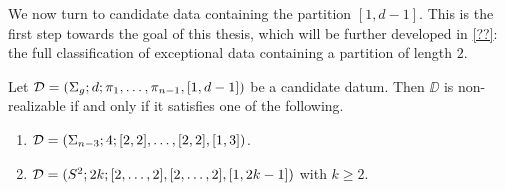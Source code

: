 We now turn to candidate data containing the partition $[1,d-1]$. This is the first step towards the goal of this thesis, which will be further developed in \cref{??}: the full classification of exceptional data containing a partition of length $2$.

\begin{proposition}\label{monodromy:th:sphere-[1 d-1]}
Let $\mathcal{D}=(\Sigma_{g};d;\pi_1,\ldots,\pi_{n-1},[1,d-1])$ be a candidate datum. Then $\DD$ is non-realizable if and only if it satisfies one of the following.
\begin{enumerate}[(1)]
\item $\mathcal{D}=(\Sigma_{n-3};4;[2,2],\ldots,[2,2],[1,3])$.
\item $\mathcal{D}=(S^2{};2k;[2,\ldots,2],[2,\ldots,2],[1,2k-1])$ with $k\ge 2$.
\end{enumerate}
\end{proposition}
